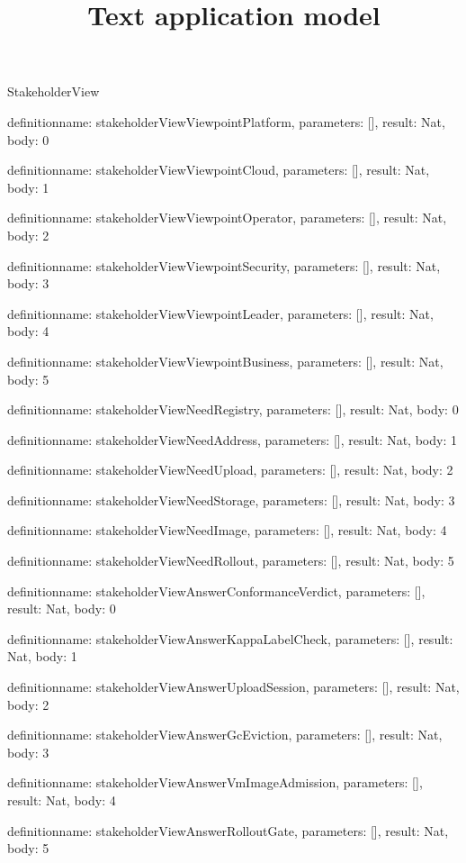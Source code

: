 \begin{lexlean}{StakeholderView}
\title{Text application model}
\begin{semanticmodule}
definition{name: stakeholderViewViewpointPlatform, parameters: [], result: Nat, body: 0}

definition{name: stakeholderViewViewpointCloud, parameters: [], result: Nat, body: 1}

definition{name: stakeholderViewViewpointOperator, parameters: [], result: Nat, body: 2}

definition{name: stakeholderViewViewpointSecurity, parameters: [], result: Nat, body: 3}

definition{name: stakeholderViewViewpointLeader, parameters: [], result: Nat, body: 4}

definition{name: stakeholderViewViewpointBusiness, parameters: [], result: Nat, body: 5}

definition{name: stakeholderViewNeedRegistry, parameters: [], result: Nat, body: 0}

definition{name: stakeholderViewNeedAddress, parameters: [], result: Nat, body: 1}

definition{name: stakeholderViewNeedUpload, parameters: [], result: Nat, body: 2}

definition{name: stakeholderViewNeedStorage, parameters: [], result: Nat, body: 3}

definition{name: stakeholderViewNeedImage, parameters: [], result: Nat, body: 4}

definition{name: stakeholderViewNeedRollout, parameters: [], result: Nat, body: 5}

definition{name: stakeholderViewAnswerConformanceVerdict, parameters: [], result: Nat, body: 0}

definition{name: stakeholderViewAnswerKappaLabelCheck, parameters: [], result: Nat, body: 1}

definition{name: stakeholderViewAnswerUploadSession, parameters: [], result: Nat, body: 2}

definition{name: stakeholderViewAnswerGcEviction, parameters: [], result: Nat, body: 3}

definition{name: stakeholderViewAnswerVmImageAdmission, parameters: [], result: Nat, body: 4}

definition{name: stakeholderViewAnswerRolloutGate, parameters: [], result: Nat, body: 5}


\end{semanticmodule}
\end{lexlean}
